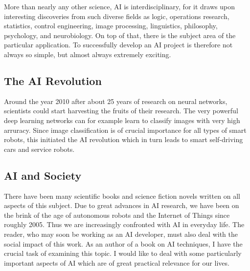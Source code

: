 \documentclass[10pt]{book}
\begin{document}
More than nearly any other science, AI is interdisciplinary, for it draws upon interesting discoveries from such diverse fields as logic, operations research, statistics, control engineering, image processing, linguistics, philosophy, psychology, and neurobiology. On top of that, there is the subject area of the particular application. To successfully develop an AI project is therefore not always so simple, but almost always extremely exciting.

\subsection{The AI Revolution}
Around the year 2010 after about 25 years of research on neural networks, scientists could start harvesting the fruits of their research. The very powerful deep learning networks can for example learn to classify images with very high arruracy. Since image classification is of crucial importance for all types of smart robots, this initiated the AI revolution which in turn leads to smart self-driving cars and service robots.

\subsection{AI and Society}
There have been many scientific books and science fiction novels written on all aspects of this subject. Due to great advances in AI research, we have been on the brink of the age of autonomous robots and the Internet of Things since roughly 2005. Thus we are increasingly confronted with AI in everyday life. The reader, who may soon be working as an AI developer, must also deal with the social impact of this work. As an author of a book on AI techniques, I have the crucial task of examining this topic. I would like to deal with some particularly important aspects of AI which are of great practical relevance for our lives.
\end{document}
